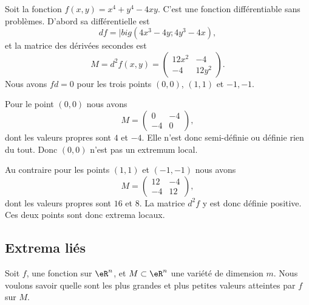\begin{example}
    Soit la fonction \( f(x,y)=x^4+y^4-4xy\). C'est une fonction différentiable sans problèmes. D'abord sa différentielle est
    \begin{equation}
        df=|big(4x^3-4y;4y^3-4x),
    \end{equation}
    et la matrice des dérivées secondes est
    \begin{equation}
        M=d^2f(x,y)=\begin{pmatrix}
            12x^2    &   -4    \\ 
            -4    &   12y^2    
        \end{pmatrix}.
    \end{equation}
    Nous avons \( fd=0\) pour les trois points \( (0,0)\), \( (1,1)\) et \( -1,-1\).

    Pour le point \( (0,0)\) nous avons
    \begin{equation}
        M=\begin{pmatrix}
            0    &   -4    \\ 
            -4    &   0    
        \end{pmatrix},
    \end{equation}
    dont les valeurs propres sont \( 4\) et \( -4\). Elle n'est donc semi-définie ou définie rien du tout. Donc \( (0,0)\) n'est pas un extremum local.

    Au contraire pour les points \( (1,1)\) et \( (-1,-1)\) nous avons
    \begin{equation}
        M=\begin{pmatrix}
            12    &   -4    \\ 
            -4    &   12    
        \end{pmatrix},
    \end{equation}
    dont les valeurs propres sont \( 16\) et \( 8\). La matrice \( d^2f\) y est donc définie positive. Ces deux points sont donc extrema locaux.
\end{example}

\subsection{Extrema liés}

Soit $f$, une fonction sur $\eR^n$, et $M\subset \eR^n$ une variété de dimension $m$. Nous voulons savoir quelle sont les plus grandes et plus petites valeurs atteintes par $f$ sur $M$.

